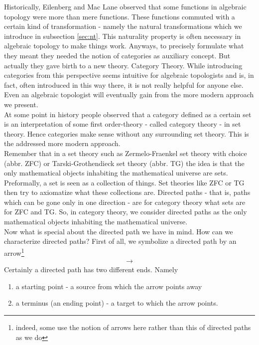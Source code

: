 Historically, Eilenberg and Mac Lane observed that some functions in algebraic topology were more than mere functions. These functions commuted with a certain kind of transformation - namely the natural transformations which we introduce in subsection \ref{sec:nt}. This naturality property is often necessary in algebraic topology to make things work. Anyways, to precisely formulate what they meant they needed the notion of categories as auxiliary concept. But actually they gave birth to a new theory. Category Theory. While introducing categories from this perspective seems intuitive for algebraic topologists and is, in fact, often introduced in this way there, it is not really helpful for anyone else. Even an algebraic topologist will eventually gain from the more modern approach we present.
\\
At some point in history people observed that a category defined as a certain set is an interpretation of some first order-theory - called category theory - in set theory. Hence categories make sense without any surrounding set theory. This is the addressed more modern approach.
\\
Remember that in a set theory such as Zermelo-Fraenkel set theory with choice (abbr. ZFC) or Tarski-Grothendieck set theory (abbr. TG) the idea is that the only mathematical objects inhabiting the mathematical universe are sets. Preformally, a set is seen as a collection of things. Set theories like ZFC or TG then try to axiomatize what these collections are. Directed paths - that is, paths which can be gone only in one direction - are for category theory what sets are for ZFC and TG. So, in category theory, we consider directed paths as the only mathematical objects inhabiting the mathematical universe.
\\
Now what is special about the directed path we have in mind. How can we characterize directed paths? First of all, we symbolize a directed path by an arrow\footnote{indeed, some use the notion of arrows here rather than this of directed paths as we do}
\begin{align*}
  \longrightarrow
\end{align*}
Certainly a directed path has two different ends. Namely
\begin{enumerate}
\item[(1)]
a starting point - a source from which the arrow points away
\item[(2)]
a terminus (an ending point) - a target to which the arrow points.
\end{enumerate}

